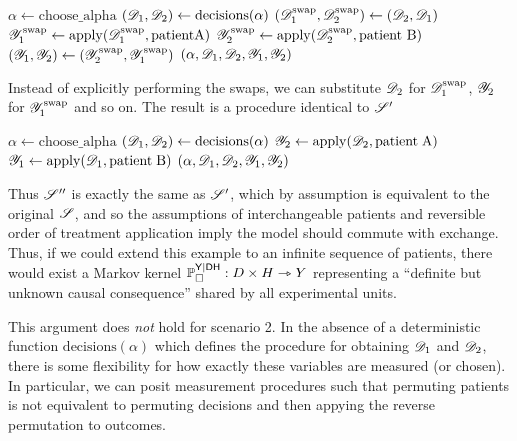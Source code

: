 \begin{algorithmic}
    \State $\alpha \gets \mathrm{choose\_alpha}$
    \State $(\mathscr{D}_1,\mathscr{D}_2) \gets \mathrm{decisions}(\alpha)$
    \State $(\mathscr{D}_1^{\mathrm{swap}},\mathscr{D}_2^{\mathrm{swap}}) \gets (\mathscr{D}_2,\mathscr{D}_1)$
    \State $\mathscr{Y}^{\mathrm{swap}}_1\gets \mathrm{apply}(\mathscr{D}_1^{\mathrm{swap}},\mathrm{patient A})$
    \State $\mathscr{Y}_2^{\mathrm{swap}}\gets \mathrm{apply}(\mathscr{D}_2^{\text{swap}},\text{patient B})$
    \State $(\mathscr{Y}_1,\mathscr{Y}_2)\gets (\mathscr{Y}^{\mathrm{swap}}_2,\mathscr{Y}^{\mathrm{swap}}_1)$
    \State \Return $(\alpha,\mathscr{D}_1,\mathscr{D}_2,\mathscr{Y}_1,\mathscr{Y}_2)$
    \EndProcedure
\end{algorithmic}

Instead of explicitly performing the swaps, we can substitute $\mathscr{D}_2$ for $\mathscr{D}_1^{\text{swap}}$, $\mathscr{Y}_2$ for $\mathscr{Y}_1^{\text{swap}}$ and so on. The result is a procedure identical to $\mathscr{S}'$

\begin{algorithmic}
    \State $\alpha \gets \mathrm{choose\_alpha}$
    \State $(\mathscr{D}_1,\mathscr{D}_2) \gets \mathrm{decisions}(\alpha)$
    \State $\mathscr{Y}_2\gets \mathrm{apply}(\mathscr{D}_2,\mathrm{patient\;A})$
    \State $\mathscr{Y}_1\gets \mathrm{apply}(\mathscr{D}_1,\mathrm{patient\;B})$
    \State \Return $(\alpha,\mathscr{D}_1,\mathscr{D}_2,\mathscr{Y}_1,\mathscr{Y}_2)$
    \EndProcedure
\end{algorithmic}

Thus $\mathscr{S}''$ is exactly the same as $\mathscr{S}'$, which by assumption is equivalent to the original $\mathscr{S}$, and so the assumptions of interchangeable patients and reversible order of treatment application imply the model should commute with exchange. Thus, if we could extend this example to an infinite sequence of patients, there would exist a Markov kernel $\mathbb{P}_\square^{\mathsf{Y}|\mathsf{DH}}:D\times H\rightarrowtriangle Y$ representing a ``definite but unknown causal consequence'' shared by all experimental units.

This argument does \emph{not} hold for scenario 2. In the absence of a deterministic function $\text{decisions}(\alpha)$ which defines the procedure for obtaining $\mathscr{D}_1$ and $\mathscr{D}_2$, there is some flexibility for how exactly these variables are measured (or chosen). In particular, we can posit measurement procedures such that permuting patients is not equivalent to permuting decisions and then appying the reverse permutation to outcomes.

